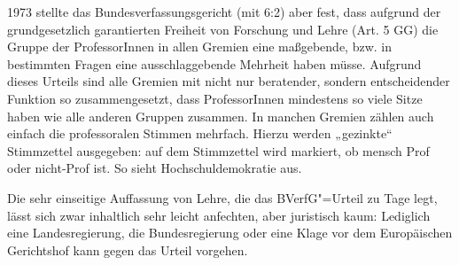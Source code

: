 1973 stellte das Bundesverfassungsgericht (mit 6:2) aber fest, dass aufgrund der grundgesetzlich garantierten Freiheit von Forschung und Lehre (Art. 5 GG) die Gruppe der ProfessorInnen in allen Gremien eine maßgebende, bzw. in bestimmten Fragen eine ausschlaggebende Mehrheit haben müsse. Aufgrund dieses Urteils sind alle Gremien mit nicht nur beratender, sondern entscheidender Funktion so zusammengesetzt, dass ProfessorInnen mindestens so viele Sitze haben wie alle anderen Gruppen zusammen. In manchen Gremien zählen auch einfach die professoralen Stimmen mehrfach. Hierzu werden „gezinkte“ Stimmzettel ausgegeben: auf dem Stimmzettel wird markiert, ob mensch Prof oder nicht-Prof ist. So sieht Hochschuldemokratie aus.

Die sehr einseitige Auffassung von Lehre, die das BVerfG"=Urteil zu Tage legt, lässt sich zwar inhaltlich sehr leicht anfechten, aber juristisch kaum: Lediglich eine Landesregierung, die Bundesregierung oder eine Klage vor dem Europäischen Gerichtshof kann gegen das Urteil vorgehen.
